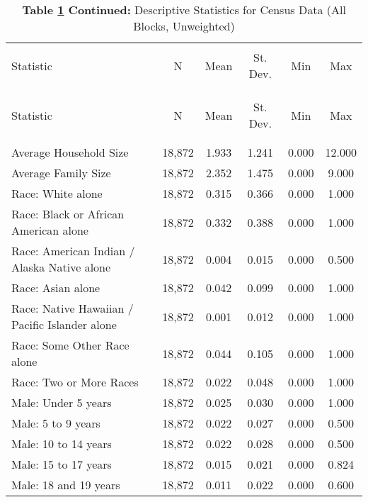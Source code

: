 
\begingroup 
\small 
\centering
\begin{longtable}{@{\extracolsep{5pt}}lccccc} 
  \caption{Descriptive Statistics for Census Data (All Blocks, Unweighted)} \label{censusstats} 
\\ 
\hline 
\hline 
\\[-1.8ex] 
Statistic & \multicolumn{1}{c}{N} & \multicolumn{1}{c}{Mean} & \multicolumn{1}{c}{St. Dev.} & \multicolumn{1}{c}{Min} & \multicolumn{1}{c}{Max} \\
\hline 
\\[-1.8ex] 
\endfirsthead
  \caption*{\textbf{Table \ref{censusstats} Continued:} Descriptive Statistics for Census Data (All Blocks, Unweighted)}
\\ 
\hline 
\hline 
\\[-1.8ex] 
Statistic & \multicolumn{1}{c}{N} & \multicolumn{1}{c}{Mean} & \multicolumn{1}{c}{St. Dev.} & \multicolumn{1}{c}{Min} & \multicolumn{1}{c}{Max} \\
\hline 
\\[-1.8ex] 
\endhead
\\[-1.8ex] 
\hline 
\endfoot
Average Household Size & 18,872 & 1.933 & 1.241 & 0.000 & 12.000 \\ 
Average Family Size & 18,872 & 2.352 & 1.475 & 0.000 & 9.000 \\ 
Race: White alone & 18,872 & 0.315 & 0.366 & 0.000 & 1.000 \\ 
Race: Black or African American alone & 18,872 & 0.332 & 0.388 & 0.000 & 1.000 \\ 
Race: American Indian / Alaska Native alone & 18,872 & 0.004 & 0.015 & 0.000 & 0.500 \\ 
Race: Asian alone & 18,872 & 0.042 & 0.099 & 0.000 & 1.000 \\ 
Race: Native Hawaiian / Pacific Islander alone & 18,872 & 0.001 & 0.012 & 0.000 & 1.000 \\ 
Race: Some Other Race alone & 18,872 & 0.044 & 0.105 & 0.000 & 1.000 \\ 
Race: Two or More Races & 18,872 & 0.022 & 0.048 & 0.000 & 1.000 \\ 
Male: Under 5 years & 18,872 & 0.025 & 0.030 & 0.000 & 1.000 \\ 
Male: 5 to 9 years & 18,872 & 0.022 & 0.027 & 0.000 & 0.500 \\ 
Male: 10 to 14 years & 18,872 & 0.022 & 0.028 & 0.000 & 0.500 \\ 
Male: 15 to 17 years & 18,872 & 0.015 & 0.021 & 0.000 & 0.824 \\ 
Male: 18 and 19 years & 18,872 & 0.011 & 0.022 & 0.000 & 0.600 \\ 

\end{longtable}
